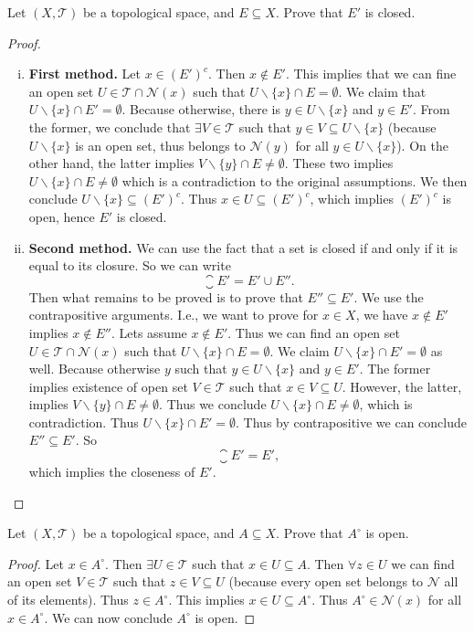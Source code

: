 \begin{problem}
	Let $(X,\mathcal{T})$ be a topological space, and $E \subseteq X$. Prove that $E'$ is closed.
\end{problem}
\begin{proof}
	~\vspace{2pt}
	\begin{enumerate}[(i)]
		\item \textbf{First method.}
			Let $x \in (E')^c$. Then $x \notin E'$. This implies that we can fine an open set $U \in \mathcal{T} \cap \mathcal{N}(x)$ such that $U\backslash\{x\} \cap E = \emptyset$. We claim that $U\backslash\{x\} \cap E' = \emptyset$. Because otherwise, there is $y \in U\backslash\{x\} $ and $y \in E'$. From the former, we conclude that $\exists V \in \mathcal{T}$ such that $y \in V \subseteq U\backslash\{x\}$ (because $U\backslash\{x\}$ is an open set, thus belongs to $\mathcal{N}(y)$ for all $y\in U\backslash\{x\}$). On the other hand, the latter implies $V\backslash\{y\} \cap E \neq \emptyset$. These two implies $U\backslash\{x\} \cap E \neq \emptyset$ which is a contradiction to the original assumptions. We then conclude $U\backslash\{x\} \subseteq (E')^c$. Thus $x \in U \subseteq (E')^c$, which implies $(E')^c$ is open, hence $E'$ is closed.
		\item \textbf{Second method.}
			We can use the fact that a set is closed if and only if it is equal to its closure. So we can write
			\[ \closure{E'} = E' \cup E''. \]
			Then what remains to be proved is to prove that $E'' \subseteq E'$. We use the contrapositive arguments. I.e., we want to prove for $x \in X$, we have $x \notin E'$ implies $x \notin E''$. Lets assume $x \notin E'$. Thus we can find an open set $U \in \mathcal{T} \cap \mathcal{N}(x)$ such that $U\backslash\{x\} \cap E =\emptyset$. We claim $U\backslash\{x\} \cap E' = \emptyset$ as well. Because otherwise $y$ such that $ y \in U\backslash\{x\} $ and  $y \in E'$. The former implies existence of open set $V \in \mathcal{T}$ such that $x \in V \subseteq U$. However, the latter, implies $V\backslash\{y\} \cap E \neq \emptyset$. Thus we conclude $U\backslash\{x\} \cap E \neq \emptyset$, which is contradiction. Thus $U\backslash\{x\} \cap E' = \emptyset$. Thus by contrapositive we can conclude $E'' \subseteq E'$. So
			\[ \closure{E'} = E', \]
			which implies the closeness of $E'$.
	\end{enumerate}

\end{proof}

\begin{problem}
	Let $(X,\mathcal{T})$ be a topological space, and $A \subseteq X$. Prove that $A^\circ$ is open.
\end{problem}
\begin{proof}
	Let $x \in A^\circ$. Then $\exists U \in \mathcal{T}$ such that $x \in U \subseteq A$. Then $\forall z \in U$ we can find an open set $V \in \mathcal{T}$ such that $z \in V \subseteq U$ (because every open set belongs to $\mathcal{N}$ all of its elements). Thus $z \in A^\circ$. This implies $x\in U \subseteq A^\circ$. Thus $A^\circ \in \mathcal{N}(x)$ for all $x \in A^\circ$. We can now conclude $A^\circ$ is open.
\end{proof}

